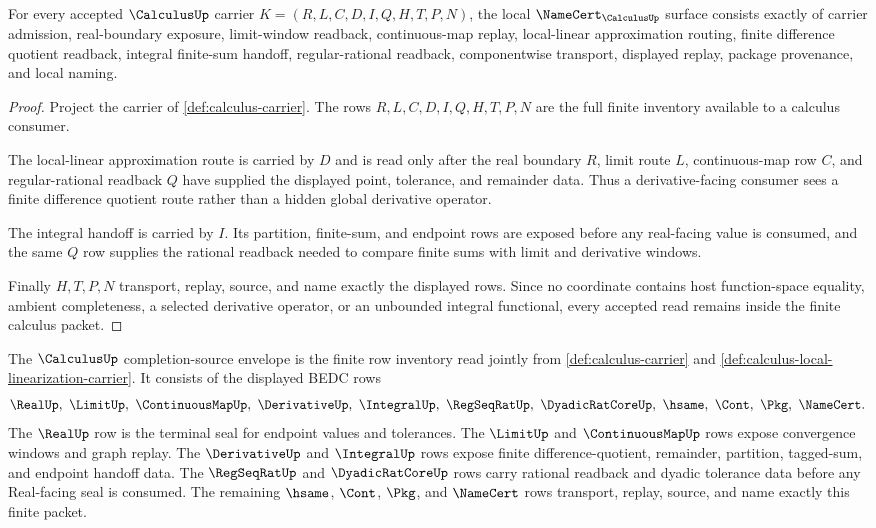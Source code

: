 \begin{theorem}
\label{thm:calculus-namecert-obligations}
For every accepted $\CalculusUp$ carrier $K=(R,L,C,D,I,Q,H,T,P,N)$, the local $\NameCert_{\CalculusUp}$ surface consists exactly of carrier admission, real-boundary exposure, limit-window readback, continuous-map replay, local-linear approximation routing, finite difference quotient readback, integral finite-sum handoff, regular-rational readback, componentwise transport, displayed replay, package provenance, and local naming.
\end{theorem}
\begin{proof}
Project the carrier of \autoref{def:calculus-carrier}. The rows $R,L,C,D,I,Q,H,T,P,N$ are the full finite inventory available to a calculus consumer.

The local-linear approximation route is carried by $D$ and is read only after the real boundary $R$, limit route $L$, continuous-map row $C$, and regular-rational readback $Q$ have supplied the displayed point, tolerance, and remainder data. Thus a derivative-facing consumer sees a finite difference quotient route rather than a hidden global derivative operator.

The integral handoff is carried by $I$. Its partition, finite-sum, and endpoint rows are exposed before any real-facing value is consumed, and the same $Q$ row supplies the rational readback needed to compare finite sums with limit and derivative windows.

Finally $H,T,P,N$ transport, replay, source, and name exactly the displayed rows. Since no coordinate contains host function-space equality, ambient completeness, a selected derivative operator, or an unbounded integral functional, every accepted read remains inside the finite calculus packet.
\end{proof}

\begin{definition}
\label{def:calculus-completion-source-envelope}
The $\CalculusUp$ completion-source envelope is the finite row inventory read jointly from \autoref{def:calculus-carrier} and \autoref{def:calculus-local-linearization-carrier}. It consists of the displayed BEDC rows
$$
\RealUp,\ \LimitUp,\ \ContinuousMapUp,\ \DerivativeUp,\ \IntegralUp,\ \RegSeqRatUp,\ \DyadicRatCoreUp,\ \hsame,\ \Cont,\ \Pkg,\ \NameCert.
$$
The $\RealUp$ row is the terminal seal for endpoint values and tolerances. The $\LimitUp$ and $\ContinuousMapUp$ rows expose convergence windows and graph replay. The $\DerivativeUp$ and $\IntegralUp$ rows expose finite difference-quotient, remainder, partition, tagged-sum, and endpoint handoff data. The $\RegSeqRatUp$ and $\DyadicRatCoreUp$ rows carry rational readback and dyadic tolerance data before any Real-facing seal is consumed. The remaining $\hsame$, $\Cont$, $\Pkg$, and $\NameCert$ rows transport, replay, source, and name exactly this finite packet.
\end{definition}

